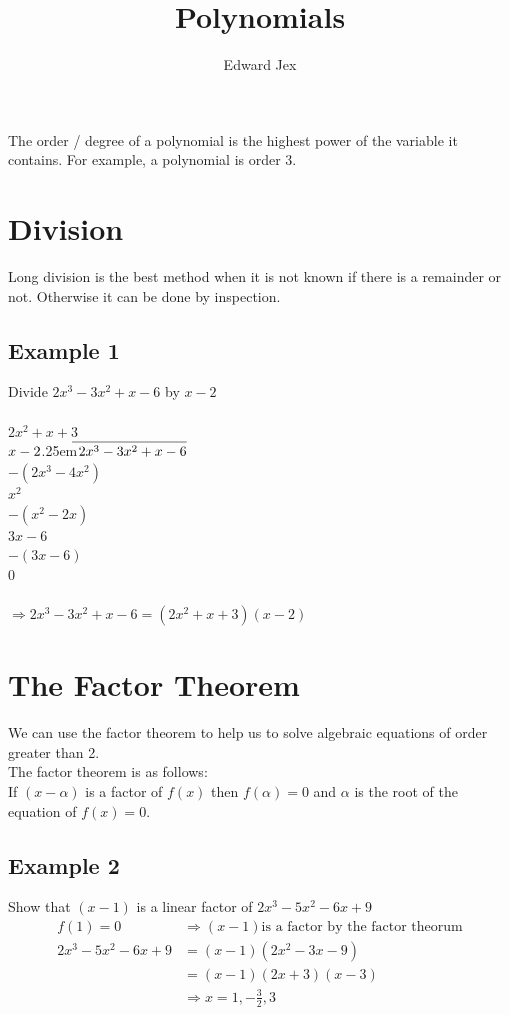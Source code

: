 \documentclass[a4paper,12pt]{article}
\newcommand\longdiv[2]{%
$\strut#1$\kern.25em\smash{\raise.3ex\hbox{$\big)$}}$\mkern-8mu
        \overline{\enspace\strut#2}$}
\begin{document}
\title{Polynomials}	
\author{Edward Jex}
\maketitle
The order / degree of a polynomial is the highest power of the variable it contains. For example, a polynomial is order 3. \\
\section*{Division}
Long division is the best method when it is not known if there is a remainder or not. Otherwise it can  be done by inspection. \\
\subsection*{Example 1}
Divide $2x^3 -3x^2 + x -6$ by $x-2$ \\\\
\phantom{A}\hspace{0.8cm} $2x^2 + x + 3$ \\
\longdiv{x-2}{2x^3 -3x^2 + x -6} \\
\phantom{A}\hspace{0.3cm} $-(2x^3 -4x^2)$ \\
\phantom{A}\hspace{2.1cm} $x^2$ \\
\phantom{A}\hspace{1.6cm} $-(x^2-2x)$ \\
\phantom{A}\hspace{3cm} $3x-6$ \\
\phantom{A}\hspace{2.5cm} $-(3x-6)$ \\
\phantom{A}\hspace{4cm} $0$ \\\\
$\Rightarrow 2x^3 -3x^2 + x -6 = (2x^2 + x + 3)(x-2)$
\section*{The Factor Theorem}
We can use the factor theorem to help us to solve algebraic equations of order greater than 2. \\
The factor theorem is as follows: \\
If $(x-\alpha)$ is a factor of $f(x)$ then $f(\alpha) = 0$ and $\alpha$ is the root of the equation of $f(x) = 0$. \\
\subsection*{Example 2}
Show that $(x-1)$ is a linear factor of $2x^3 - 5x^2 - 6x + 9$ \\ 
\begin{align*}
f(1) = 0 & \Rightarrow (x-1) \text{is a factor by the factor theorum} \\
2x^3 - 5x^2 - 6x + 9 & = (x-1)(2x^2-3x-9) \\
& = (x-1)(2x+3)(x-3) \\
& \Rightarrow x = 1, -\frac{3}{2}, 3 \\
\end{align*}
\end{document}
